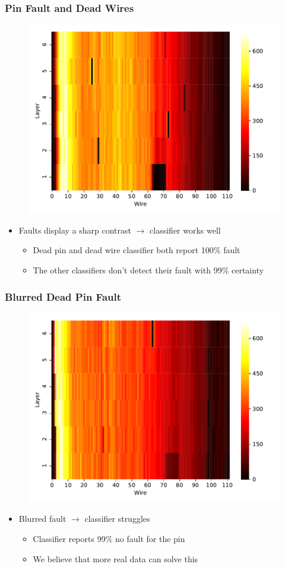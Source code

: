 \begin{frame}
  \frametitle{Pin Fault and Dead Wires}
  \begin{figure}
    \includegraphics[width=.64\textwidth]{../figures/small_pin_success}
  \end{figure}
  \begin{itemize}
    \item Faults display a sharp contrast \(\rightarrow\) classifier
      works well
      \begin{itemize}
        \item Dead pin and dead wire classifier both report 100\%
          fault
        \item The other classifiers don't detect their
          fault with 99\% certainty
      \end{itemize}
  \end{itemize}
\end{frame}

\begin{frame}
  \frametitle{Blurred Dead Pin Fault}
  \begin{figure}
    \includegraphics[width=.64\textwidth]{../figures/small_pin_fail}
  \end{figure}
  \begin{itemize}
    \item Blurred fault \(\rightarrow\) classifier struggles
      \begin{itemize}
        \item Classifier reports 99\% no fault for the pin
        \item We believe that more real data can solve this
      \end{itemize}
  \end{itemize}
\end{frame}

